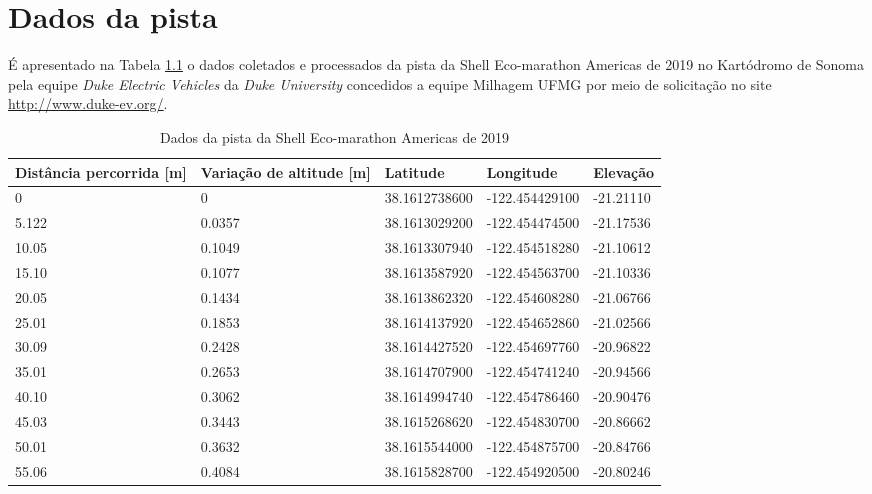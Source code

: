 \chapter{Dados da pista}

É apresentado na Tabela \ref{tab:Pista} o dados coletados e processados da pista da Shell Eco-marathon Americas de 2019
 no Kartódromo de Sonoma pela equipe \textit{Duke Electric Vehicles} da 
\textit{Duke University} concedidos a equipe Milhagem UFMG por meio de solicitação no site \url{http://www.duke-ev.org/}.

\begin{longtable}{p{2.5cm}p{2.5cm}p{3cm}p{3cm}p{2.5cm}}
    \caption{Dados da pista da Shell Eco-marathon Americas de 2019}\label{tab:Pista}\\
    \toprule
	\textbf{Distância percorrida [m]} & \textbf{Variação de altitude [m]} & \textbf{Latitude} & \textbf{Longitude} &\textbf{Elevação}\\
    \hline
        0	  &       0	    &               38.1612738600  &   -122.454429100   &	-21.21110 \\
        5.122  &	     0.0357 &               38.1613029200  &   -122.454474500   &	-21.17536 \\
        10.05  &	     0.1049 &               38.1613307940  &   -122.454518280   &	-21.10612 \\
        15.10  &	     0.1077 &               38.1613587920  &   -122.454563700   &	-21.10336 \\
        20.05  &	     0.1434 &               38.1613862320  &   -122.454608280   &	-21.06766 \\
        25.01  &	     0.1853 &               38.1614137920  &   -122.454652860   &	-21.02566 \\
        30.09  &	     0.2428 &               38.1614427520  &   -122.454697760   &	-20.96822 \\
        35.01  &	     0.2653 &               38.1614707900  &   -122.454741240   &	-20.94566 \\
        40.10  &	     0.3062 &               38.1614994740  &   -122.454786460   &	-20.90476 \\
        45.03  &	     0.3443 &               38.1615268620  &   -122.454830700   &	-20.86662 \\
        50.01  &	     0.3632 &               38.1615544000  &   -122.454875700   &	-20.84766 \\
        55.06  &	     0.4084 &               38.1615828700  &   -122.454920500   &	-20.80246 \\

\end{longtable}
